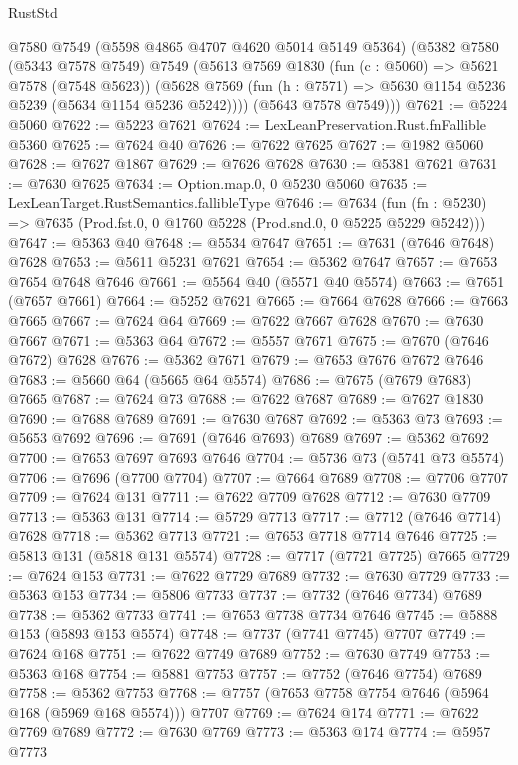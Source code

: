 \begin{lexlean}{RustStd}
\begin{coremodule}
      @7580
      @7549
      (@5598 @4865 @4707 @4620 @5014 @5149 @5364)
      (@5382
        @7580
        (@5343 @7578 @7549)
        @7549
        (@5613
          @7569
          @1830
          (fun (c : @5060) => @5621 @7578 (@7548 @5623))
          (@5628 @7569 (fun (h : @7571) => @5630 @1154 @5236 @5239 (@5634 @1154 @5236 @5242))))
        (@5643 @7578 @7549)))
@7621 := @5224 @5060
@7622 := @5223 @7621
@7624 := LexLeanPreservation.Rust.fnFallible @5360
@7625 := @7624 @40
@7626 := @7622 @7625
@7627 := @1982 @5060
@7628 := @7627 @1867
@7629 := @7626 @7628
@7630 := @5381 @7621
@7631 := @7630 @7625
@7634 := Option.map.{0, 0} @5230 @5060
@7635 := LexLeanTarget.RustSemantics.fallibleType
@7646 := @7634
    (fun (fn : @5230) => @7635 (Prod.fst.{0, 0} @1760 @5228 (Prod.snd.{0, 0} @5225 @5229 @5242)))
@7647 := @5363 @40
@7648 := @5534 @7647
@7651 := @7631 (@7646 @7648) @7628
@7653 := @5611 @5231 @7621
@7654 := @5362 @7647
@7657 := @7653 @7654 @7648 @7646
@7661 := @5564 @40 (@5571 @40 @5574)
@7663 := @7651 (@7657 @7661)
@7664 := @5252 @7621
@7665 := @7664 @7628
@7666 := @7663 @7665
@7667 := @7624 @64
@7669 := @7622 @7667 @7628
@7670 := @7630 @7667
@7671 := @5363 @64
@7672 := @5557 @7671
@7675 := @7670 (@7646 @7672) @7628
@7676 := @5362 @7671
@7679 := @7653 @7676 @7672 @7646
@7683 := @5660 @64 (@5665 @64 @5574)
@7686 := @7675 (@7679 @7683) @7665
@7687 := @7624 @73
@7688 := @7622 @7687
@7689 := @7627 @1830
@7690 := @7688 @7689
@7691 := @7630 @7687
@7692 := @5363 @73
@7693 := @5653 @7692
@7696 := @7691 (@7646 @7693) @7689
@7697 := @5362 @7692
@7700 := @7653 @7697 @7693 @7646
@7704 := @5736 @73 (@5741 @73 @5574)
@7706 := @7696 (@7700 @7704)
@7707 := @7664 @7689
@7708 := @7706 @7707
@7709 := @7624 @131
@7711 := @7622 @7709 @7628
@7712 := @7630 @7709
@7713 := @5363 @131
@7714 := @5729 @7713
@7717 := @7712 (@7646 @7714) @7628
@7718 := @5362 @7713
@7721 := @7653 @7718 @7714 @7646
@7725 := @5813 @131 (@5818 @131 @5574)
@7728 := @7717 (@7721 @7725) @7665
@7729 := @7624 @153
@7731 := @7622 @7729 @7689
@7732 := @7630 @7729
@7733 := @5363 @153
@7734 := @5806 @7733
@7737 := @7732 (@7646 @7734) @7689
@7738 := @5362 @7733
@7741 := @7653 @7738 @7734 @7646
@7745 := @5888 @153 (@5893 @153 @5574)
@7748 := @7737 (@7741 @7745) @7707
@7749 := @7624 @168
@7751 := @7622 @7749 @7689
@7752 := @7630 @7749
@7753 := @5363 @168
@7754 := @5881 @7753
@7757 := @7752 (@7646 @7754) @7689
@7758 := @5362 @7753
@7768 := @7757 (@7653 @7758 @7754 @7646 (@5964 @168 (@5969 @168 @5574))) @7707
@7769 := @7624 @174
@7771 := @7622 @7769 @7689
@7772 := @7630 @7769
@7773 := @5363 @174
@7774 := @5957 @7773

\end{coremodule}
\end{lexlean}
